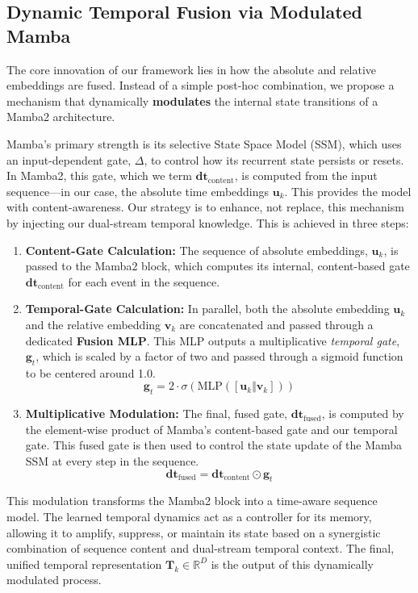 \documentclass{article}
\begin{document}
\subsection{Dynamic Temporal Fusion via Modulated Mamba}
The core innovation of our framework lies in how the absolute and relative embeddings are fused. Instead of a simple post-hoc combination, we propose a mechanism that dynamically \textbf{modulates} the internal state transitions of a Mamba2 architecture.

Mamba's primary strength is its selective State Space Model (SSM), which uses an input-dependent gate, $\Delta$, to control how its recurrent state persists or resets. In Mamba2, this gate, which we term $\mathbf{dt}_{\text{content}}$, is computed from the input sequence—in our case, the absolute time embeddings $\mathbf{u}_k$. This provides the model with content-awareness. Our strategy is to enhance, not replace, this mechanism by injecting our dual-stream temporal knowledge. This is achieved in three steps:

\begin{enumerate}
    \item \textbf{Content-Gate Calculation:} The sequence of absolute embeddings, $\mathbf{u}_k$, is passed to the Mamba2 block, which computes its internal, content-based gate $\mathbf{dt}_{\text{content}}$ for each event in the sequence.
    
    \item \textbf{Temporal-Gate Calculation:} In parallel, both the absolute embedding $\mathbf{u}_k$ and the relative embedding $\mathbf{v}_k$ are concatenated and passed through a dedicated \textbf{Fusion MLP}. This MLP outputs a multiplicative \textit{temporal gate}, $\mathbf{g}_t$, which is scaled by a factor of two and passed through a sigmoid function to be centered around 1.0.
    \begin{equation}
        \mathbf{g}_t = 2 \cdot \sigma\left(\text{MLP}([\mathbf{u}_k \Vert \mathbf{v}_k])\right)
    \end{equation}
    
    \item \textbf{Multiplicative Modulation:} The final, fused gate, $\mathbf{dt}_{\text{fused}}$, is computed by the element-wise product of Mamba's content-based gate and our temporal gate. This fused gate is then used to control the state update of the Mamba SSM at every step in the sequence.
    \begin{equation}
        \mathbf{dt}_{\text{fused}} = \mathbf{dt}_{\text{content}} \odot \mathbf{g}_t
    \end{equation}
\end{enumerate}

This modulation transforms the Mamba2 block into a time-aware sequence model. The learned temporal dynamics act as a controller for its memory, allowing it to amplify, suppress, or maintain its state based on a synergistic combination of sequence content and dual-stream temporal context. The final, unified temporal representation $\mathbf{T}_k \in \mathbb{R}^D$ is the output of this dynamically modulated process.
\end{document}
